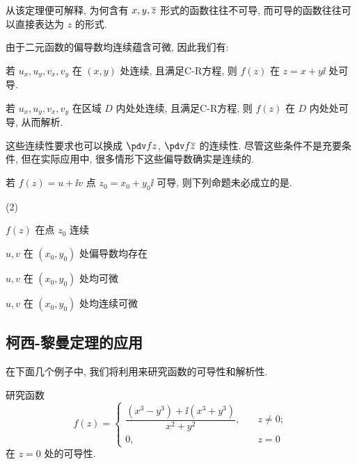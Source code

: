 从该定理便可解释, 为何含有 $x,y,\overline z$ 形式的函数往往不可导, 而可导的函数往往可以直接表达为 $z$ 的形式.

由于二元函数的偏导数均连续蕴含可微, 因此我们有:

\begin{theorem}
  \begin{enuma}
    \item 若 $u_x,u_y,v_x,v_y$ 在 $(x,y)$ 处连续, 且满足C-R方程, 则 $f(z)$ 在 $z=x+y\ii$ 处可导.
    \item 若 $u_x,u_y,v_x,v_y$ 在区域 $D$ 内处处连续, 且满足C-R方程, 则 $f(z)$ 在 $D$ 内处处可导, 从而解析.
  \end{enuma}
\end{theorem}

这些连续性要求也可以换成 $\displaystyle \pdv fz$, $\displaystyle \pdv f{\ov z}$ 的连续性.
尽管这些条件不是充要条件, 但在实际应用中, 很多情形下这些偏导数确实是连续的.

\begin{exercise}
  若 $f(z)=u+\ii v$ 点 $z_0=x_0+y_0\ii$ 可导, 则下列命题未必成立的是\fillbrace{}.
  \begin{examplechoice}(2)
    \item $f(z)$ 在点 $z_0$ 连续
    \item $u,v$ 在 $(x_0,y_0)$ 处偏导数均存在
    \item $u,v$ 在 $(x_0,y_0)$ 处均可微
    \item $u,v$ 在 $(x_0,y_0)$ 处均连续可微
  \end{examplechoice}
\end{exercise}


\subsection{柯西-黎曼定理的应用}

在下面几个例子中, 我们将利用\thmCR 来研究函数的可导性和解析性.

\begin{example}
  研究函数
  \[
    f(z)=\begin{cases}
      \dfrac{(x^3-y^3)+\ii(x^3+y^3)}{x^2+y^2},\quad &z\neq 0;\\
      0,&z=0
    \end{cases}
  \]
  在 $z=0$ 处的可导性.
\end{example}


